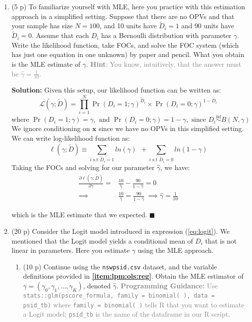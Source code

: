 \documentclass[
]{article}
\begin{document}
\begin{enumerate}
\def\labelenumi{\arabic{enumi}.}
\setcounter{enumi}{3}
\item
  (5 p) To familiarize yourself with MLE, here you practice with this
  estimation approach in a simplified setting. Suppose that there are no
  OPVs and that your sample has size \(N=100\), and 10 units have
  \(\tilde{D}_i=1\) and 90 units have \(\tilde{D}_i=0\). Assume that
  each \(D_i\) has a Bernoulli distribution with parameter \(\gamma\).
  Write the likelihood function, take FOCs, and solve the FOC system
  (which has just one equation in one unknown) by paper and pencil. What
  you obtain is the MLE estimate of \(\gamma\).
  \textcolor{gray}{\textbf{Hint}: You know, intuitively, that the answer must be $\hat{\gamma}=\frac{1}{10}$.}

  \textbf{Solution:} Given this setup, our likelihood function can be
  written as: \[
           \mathcal{L}(\gamma; \tilde{D}) = \prod_{i=1}^{N}\Pr(D_i=1; \gamma)^{\tilde{D}_i}\times \Pr(D_i=0; \gamma)^{1-\tilde{D}_i}
       \] \[
           \text{where } \Pr(D_i=1; \gamma) = \gamma, \text{ and } \Pr(D_i=0; \gamma) = 1 - \gamma, \text{ since } D_i \overset{\mathrm{iid}}{\sim} B(N, \gamma)
       \] We ignore conditioning on \(\mathbf{x}\) since we have no OPVs
  in this simplified setting. We can write log-likelihood function as:
  \[
           \ell(\gamma; \tilde{D}) \equiv \sum_{i \text{ s.t } \tilde{D}_i = 1} ln(\gamma) \ \ + \sum_{i \text{ s.t } \tilde{D}_i = 0} ln(1 - \gamma)
       \] Taking the FOCs and solving for our parameter
  \(\hat{\gamma}\), we have: \begin{align*}
           \frac{\partial \ell(\gamma; \tilde{D})}{\partial \gamma} = & \frac{10}{\hat{\gamma}} - \frac{90}{1 - \hat{\gamma}} = 0 \\
           \implies &\frac{10}{\hat{\gamma}} = \frac{90}{1 - \hat{\gamma}} \ \implies \hat{\gamma} = \frac{1}{10}
       \end{align*}

  which is the MLE estimate that we expected. \hfill \(\blacksquare\)
\item
  (20 p) Consider the Logit model introduced in expression
  (\ref{eq:logit}). We mentioned that the Logit model yields a
  conditional mean of \(D_i\) that is not linear in parameters. Here you
  estimate \(\gamma\) using the MLE approach.

  \begin{enumerate}
  \def\labelenumii{\alph{enumii}.}
  \item
    (10 p) Continue using the \texttt{nswpsid.csv} dataset, and the
    variable definitions provided in \textbf{\ref{item:lpm:ols:reg}}.
    Obtain the MLE estimator of
    \(\gamma= (\gamma_0,\gamma_1,\dots,\gamma_K)\), denoted
    \(\hat{\gamma}\).
    \textcolor{gray}{\textbf{Programming Guidance:} Use \\ \texttt{stats::glm(pscore\_formula, family = binomial( ), data = psid\_tb)} where \texttt{family = binomial( )} tells R that you want to estimate a Logit model; \texttt{psid\_tb} is the name of the dataframe in our R script.}\label{item:logit:reg}


\end{enumerate}
\end{enumerate}
\end{document}
